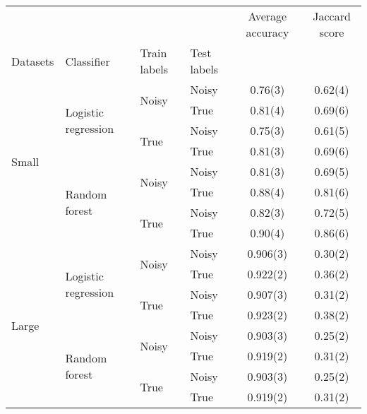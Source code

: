 \begin{tabular}{llllcc}
\toprule
      &               &      &      & Average accuracy & Jaccard score \\
Datasets & Classifier & Train labels & Test labels &                  &               \\
\midrule
\multirow{8}{*}{Small} & \multirow{4}{*}{Logistic regression} & \multirow{2}{*}{Noisy} & Noisy &          0.76(3) &       0.62(4) \\
      &               &      & True &          0.81(4) &       0.69(6) \\
\cline{3-6}
      &               & \multirow{2}{*}{True} & Noisy &          0.75(3) &       0.61(5) \\
      &               &      & True &          0.81(3) &       0.69(6) \\
\cline{2-6}
\cline{3-6}
      & \multirow{4}{*}{Random forest} & \multirow{2}{*}{Noisy} & Noisy &          0.81(3) &       0.69(5) \\
      &               &      & True &          0.88(4) &       0.81(6) \\
\cline{3-6}
      &               & \multirow{2}{*}{True} & Noisy &          0.82(3) &       0.72(5) \\
      &               &      & True &          0.90(4) &       0.86(6) \\
\cline{1-6}
\cline{2-6}
\cline{3-6}
\multirow{8}{*}{Large} & \multirow{4}{*}{Logistic regression} & \multirow{2}{*}{Noisy} & Noisy &         0.906(3) &       0.30(2) \\
      &               &      & True &         0.922(2) &       0.36(2) \\
\cline{3-6}
      &               & \multirow{2}{*}{True} & Noisy &         0.907(3) &       0.31(2) \\
      &               &      & True &         0.923(2) &       0.38(2) \\
\cline{2-6}
\cline{3-6}
      & \multirow{4}{*}{Random forest} & \multirow{2}{*}{Noisy} & Noisy &         0.903(3) &       0.25(2) \\
      &               &      & True &         0.919(2) &       0.31(2) \\
\cline{3-6}
      &               & \multirow{2}{*}{True} & Noisy &         0.903(3) &       0.25(2) \\
      &               &      & True &         0.919(2) &       0.31(2) \\
\bottomrule
\end{tabular}
